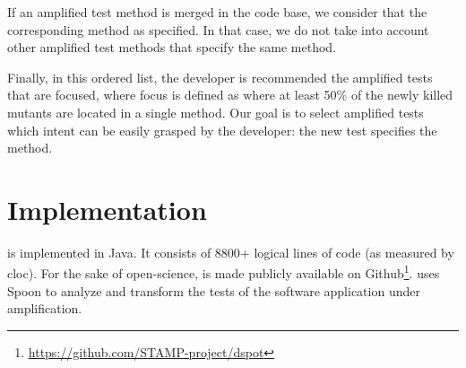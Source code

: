 If an amplified test method is merged in the code base, we consider that the corresponding method as specified. In that case, we do not take into account other amplified test methods that specify the same method.

Finally, in this ordered list, the developer is recommended the amplified tests that are focused, where focus is defined as where at least 50\% of the newly killed mutants are located in a single method. Our goal is to select amplified tests which intent can be easily grasped by the developer: the new test specifies the method.

\section{Implementation}

\dspot is implemented in Java.
It consists of 8800+ logical lines of code (as measured by cloc).
For the sake of open-science, \dspot is made publicly available on Github\footnote{\url{https://github.com/STAMP-project/dspot}}.
\dspot uses Spoon\cite{pawlak:hal-01169705} to analyze and transform the tests of the software application under amplification.